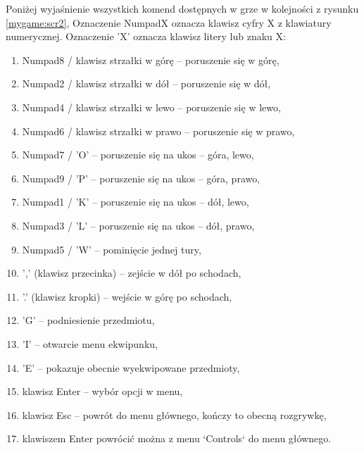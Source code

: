 \documentclass[12pt,twoside]{article}
\begin{document}
Poniżej wyjaśnienie wszystkich komend dostępnych w grze w kolejności z rysunku \ref{mygame:scr2}, Oznaczenie NumpadX oznacza klawisz cyfry X z klawiatury numerycznej. Oznaczenie 'X' oznacza klawisz litery lub znaku X:

\begin{enumerate}
	\item Numpad8 / klawisz strzałki w górę -- poruszenie się w górę,
	\item Numpad2 / klawisz strzałki w dół -- poruszenie się w dół,
	\item Numpad4 / klawisz strzałki w lewo -- poruszenie się w lewo,
	\item Numpad6 / klawisz strzałki w prawo -- poruszenie się w prawo,
	\item Numpad7 / 'O' -- poruszenie się na ukos -- góra, lewo,
	\item Numpad9 / 'P' -- poruszenie się na ukos -- góra, prawo,
	\item Numpad1 / 'K' -- poruszenie się na ukos -- dół, lewo,
	\item Numpad3 / 'L' -- poruszenie się na ukos -- dół, prawo,
	\item Numpad5 / 'W' -- pominięcie jednej tury,
	\item ',' (klawisz przecinka) -- zejście w dół po schodach,
	\item '.' (klawisz kropki) -- wejście w górę po schodach,
	\item 'G' -- podniesienie przedmiotu,
	\item 'I' -- otwarcie menu ekwipunku,
	\item 'E' -- pokazuje obecnie wyekwipowane przedmioty,
	\item klawisz Enter -- wybór opcji w menu,
	\item klawisz Esc -- powrót do menu głównego, kończy to obecną rozgrywkę,
	\item klawiszem Enter powrócić można z menu `Controls` do menu głównego.
\end{enumerate}
\end{document}
